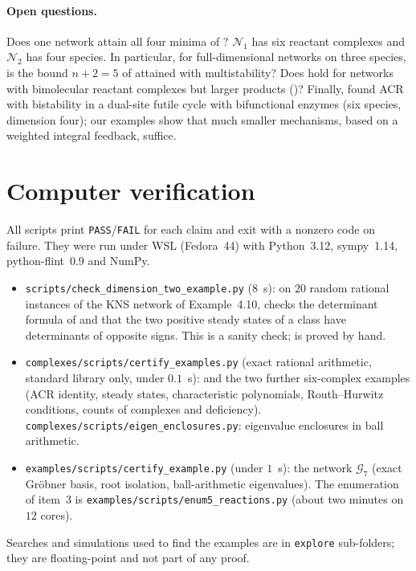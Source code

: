 \documentclass[11pt,a4paper]{report}
\begin{document}
\paragraph{Open questions.} Does one network attain all four minima of ? $\mathcal N_1$ has six
reactant complexes and $\mathcal N_2$ has four species. In particular, for full-dimensional networks on three
species, is the bound $n+2=5$ of \autocite[Theorem~5.1]{KNS2024} attained with multistability? Does
 hold for networks with bimolecular reactant complexes but larger products
()? Finally, \autocite{JNJ2026} found ACR with bistability in a dual-site futile cycle with
bifunctional enzymes (six species, dimension four); our examples show that much smaller mechanisms, based on a
weighted integral feedback, suffice.

\section{Computer verification}\label{sec:computer}

All scripts print \texttt{PASS}/\texttt{FAIL} for each claim and exit with a nonzero code on failure. They were run
under WSL (Fedora~44) with Python~3.12, sympy~1.14, python-flint~0.9 and NumPy.
\begin{itemize}
\item \texttt{scripts/check\_dimension\_two\_example.py} (8~s): on $20$ random rational instances of the KNS network
of Example~4.10, checks the determinant formula of  and that the two positive steady states of a
class have determinants of opposite signs. This is a sanity check;  is proved by hand.
\item \texttt{complexes/scripts/certify\_examples.py} (exact rational arithmetic, standard library only, under
$0.1$~s):  and the two further six-complex examples (ACR identity, steady states,
characteristic polynomials, Routh--Hurwitz conditions, counts of complexes and deficiency).
\texttt{complexes/scripts/eigen\_enclosures.py}: eigenvalue enclosures in ball arithmetic.
\item \texttt{examples/scripts/certify\_example.py} (under $1$~s): the network $\mathcal G_7$ (exact Gröbner basis,
root isolation, ball-arithmetic eigenvalues). The enumeration of item~3 is
\texttt{examples/scripts/enum5\_reactions.py} (about two minutes on $12$ cores).
\end{itemize}
Searches and simulations used to find the examples are in \texttt{explore} sub-folders; they are floating-point and
not part of any proof.
\end{document}
